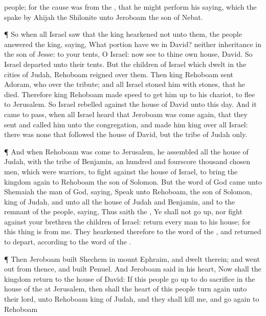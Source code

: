 {people; for the
cause was from the
{}, that he might
perform his
saying, which the
{}
spake
by
Ahijah the
Shilonite unto
Jeroboam the
son of
Nebat.
\par }{\PP {}¶
So when all
Israel
saw that the
king
hearkened not unto them, the
people
answered the
king,
saying, What
portion have we in
David? neither
{}
inheritance in the
son of
Jesse: to your
tents, O
Israel: now
see to thine own
house,
David. So
Israel
departed unto their
tents.
But
{} the
children of
Israel which
dwelt in the
cities of
Judah,
Rehoboam
reigned over them.
Then
king
Rehoboam
sent
Adoram, who
{} over the
tribute; and all
Israel
stoned him with
stones, that he
died. Therefore
king
Rehoboam made
speed to get him
up to his
chariot, to
flee to
Jerusalem.
So
Israel
rebelled against the
house of
David unto this
day.
And it came to pass, when all
Israel
heard that
Jeroboam was come
again, that they
sent and
called him unto the
congregation, and made him
king over all
Israel: there was none that
followed the
house of
David,
but the
tribe of
Judah only.
\par }{\PP {}¶ And when
Rehoboam was
come to
Jerusalem, he
assembled all the
house of
Judah, with the
tribe of
Benjamin, an
hundred and
fourscore
thousand chosen
men, which were
warriors, to
fight against the
house of
Israel, to
bring the
kingdom
again to
Rehoboam the
son of
Solomon.
But the
word of
God came unto
Shemaiah the
man of
God,
saying,
Speak unto
Rehoboam, the
son of
Solomon,
king of
Judah, and unto all the
house of
Judah and
Benjamin, and to the
remnant of the
people,
saying,
Thus
saith the
{}, Ye shall not go
up, nor
fight against your
brethren the
children of
Israel:
return every
man to his
house; for this
thing
is from me. They
hearkened therefore to the
word of the
{}, and
returned to
depart, according to the
word of the
{}.
\par }{\PP {}¶ Then
Jeroboam
built
Shechem in
mount
Ephraim, and
dwelt therein; and went
out from thence, and
built
Penuel.
And
Jeroboam
said in his
heart, Now shall the
kingdom
return to the
house of
David:
If this
people go
up to
do
sacrifice in the
house of the
{} at
Jerusalem, then shall the
heart of this
people turn
again unto their
lord,
{} unto
Rehoboam
king of
Judah, and they shall
kill me, and go
again to
Rehoboam
}
